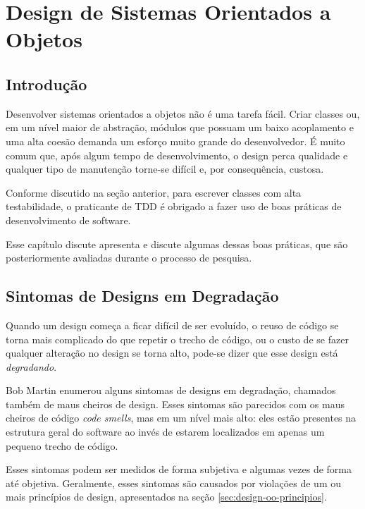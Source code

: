\chapter{Design de Sistemas Orientados a Objetos}
\label{cap:design}

\section{Introdução}
\label{sec:design-introducao}

Desenvolver sistemas orientados a objetos não é uma tarefa fácil. Criar
classes ou, em um nível maior de abstração, módulos que possuam um baixo
acoplamento e uma alta coesão demanda um esforço muito grande do desenvolvedor. 
É muito comum que, após algum tempo de desenvolvimento, o design perca qualidade
e qualquer tipo de manutenção torne-se difícil e, por consequência, custosa.

Conforme discutido na seção anterior, para escrever classes com alta
testabilidade, o praticante de TDD é obrigado a fazer uso de boas práticas de
desenvolvimento de software. 

Esse capítulo discute apresenta e discute algumas dessas boas práticas, que
são posteriormente avaliadas durante o processo de pesquisa.

\section{Sintomas de Designs em Degradação}
\label{sec:design-degradacao}

Quando um design começa a ficar difícil de ser evoluído, o reuso de código se 
torna mais complicado do que repetir o trecho de código, ou o custo de se fazer 
qualquer alteração no design se torna alto, pode-se dizer que esse design
está \textit{degradando}. 

Bob Martin \cite{bob-martin} enumerou alguns sintomas de designs em degradação, 
chamados também de maus cheiros de design. Esses sintomas são parecidos com os 
maus cheiros de código \textit{code smells}, mas em um nível mais alto: eles
estão presentes na estrutura geral do software ao invés de estarem localizados
em apenas um pequeno trecho de código.

Esses sintomas podem ser medidos de forma subjetiva e algumas vezes de forma 
até objetiva. Geralmente, esses sintomas são causados por violações de um ou 
mais princípios de design, apresentados na seção \ref{sec:design-oo-principios}.

